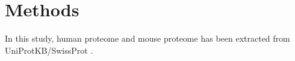 \section{Methods}
In this study, human proteome and mouse proteome has been extracted from UniProtKB/SwissProt \cite{2007}. 


